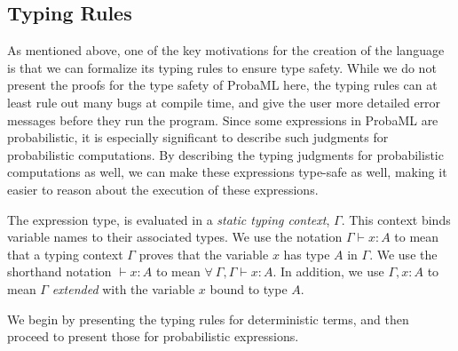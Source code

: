\documentclass[pageno]{jpaper}
\begin{document}
\subsection{Typing Rules} \label{typing_rules}
As mentioned above, one of the key motivations for the creation of the language is that we can formalize its typing rules to ensure type safety. While we do not present the proofs for the type safety of ProbaML here, the typing rules can at least rule out many bugs at compile time, and give the user more detailed error messages before they run the program. Since some expressions in ProbaML are probabilistic, it is especially significant to describe such judgments for probabilistic computations. By describing the typing judgments for probabilistic computations as well, we can make these expressions type-safe as well, making it easier to reason about the execution of these expressions.

The expression type, is evaluated in a \emph{static typing context}, $\Gamma$. This context binds variable names to their associated types. We use the notation $\Gamma \vdash x:A$ to mean that a typing context $\Gamma$ proves that the variable $x$ has type $A$ in $\Gamma$. We use the shorthand notation $\vdash x:A$ to mean $\forall \ \Gamma, \Gamma \vdash x:A$. In addition, we use $\Gamma,x:A$ to mean $\Gamma$ \emph{extended} with the variable $x$ bound to type $A$.

We begin by presenting the typing rules for deterministic terms, and then proceed to present those for probabilistic expressions.
\end{document}
